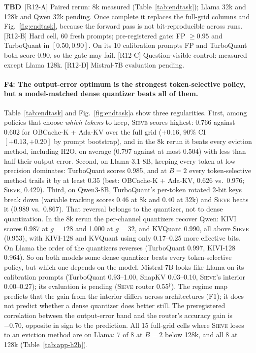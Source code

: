 \documentclass{article}
\newcommand{\tbd}[1]{{\color{tbdcol}\textbf{TBD}~#1}}
\newcommand{\est}[1]{{\color{estcol}#1$^{\dagger}$}}
\newcommand{\sieve}{\textsc{Sieve}}
\theoremstyle{definition}
\begin{document}
\tbd{[R12-A] Paired rerun: 8k measured (Table~\ref{tab:endtask}); Llama 32k and 128k and Qwen 32k pending. Once complete it replaces the full-grid columns and Fig.~\ref{fig:endtask}, because the forward pass is not bit-reproducible across runs. [R12-B] Hard cell, 60 fresh prompts; pre-registered gate: FP $\ge0.95$ and TurboQuant in $[0.50,0.90]$. On its 10 calibration prompts FP and TurboQuant both score 0.90, so the gate may fail. [R12-C] Question-visible control: measured except Llama 128k. [R12-D] Mistral-7B evaluation pending.}

\paragraph{F4: The output-error optimum is the strongest token-selective policy, but a model-matched dense quantizer beats all of them.}
Table~\ref{tab:endtask} and Fig.~\ref{fig:endtask}a show three regularities.  First, among policies that choose \emph{which tokens} to keep, \sieve{} scores highest: 0.766 against 0.602 for OBCache-K + Ada-KV over the full grid ($+0.16$, 90\% CI $[+0.13,+0.20]$ by prompt bootstrap), and in the 8k rerun it beats every eviction method, including H2O, on average (0.797 against at most 0.504) with less than half their output error.  Second, on Llama-3.1-8B, keeping every token at low precision dominates: TurboQuant scores 0.985, and at $B=2$ every token-selective method trails it by at least $0.35$ (best: OBCache-K + Ada-KV, 0.626 vs.\ 0.976; \sieve{}, 0.429).  Third, on Qwen3-8B, TurboQuant's per-token rotated 2-bit keys break down (variable tracking scores $0.46$ at 8k and $0.40$ at 32k) and \sieve{} beats it (0.989 vs.\ 0.867).  That reversal belongs to the quantizer, not to dense quantization.  In the 8k rerun the per-channel quantizers recover Qwen: KIVI scores 0.987 at $g{=}128$ and 1.000 at $g{=}32$, and KVQuant 0.990, all above \sieve{} (0.953), with KIVI-128 and KVQuant using only 0.17--0.25 more effective bits.  On Llama the order of the quantizers reverses (TurboQuant 0.997, KIVI-128 0.964).  So on both models some dense quantizer beats every token-selective policy, but which one depends on the model.  Mistral-7B looks like Llama on its calibration prompts (TurboQuant 0.93--1.00, SnapKV 0.03--0.10, \sieve{}'s interior 0.00--0.27); its evaluation is pending (\sieve{} router \est{0.55}).  The regime map predicts that the gain from the interior differs across architectures (F1); it does not predict whether a dense quantizer does better still.  The preregistered correlation between the output-error band and the router's accuracy gain is $-0.70$, opposite in sign to the prediction.  All 15 full-grid cells where \sieve{} loses to an eviction method are on Llama: 7 of 8 at $B=2$ below 128k, and all 8 at 128k (Table~\ref{tab:app-h2h}).
\end{document}
